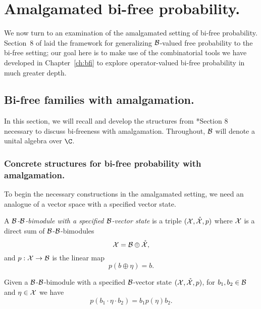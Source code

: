 \chapter{Amalgamated bi-free probability.}
\label{ch:abfp}
We now turn to an examination of the amalgamated setting of bi-free probability.
Section~8 of \cite{voiculescu2014free} laid the framework for generalizing $\mathcal{B}$-valued free probability to the bi-free setting; our goal here is to make use of the combinatorial tools we have developed in Chapter~\ref{ch:bfi} to explore operator-valued bi-free probability in much greater depth.



















\section{Bi-free families with amalgamation.}
\label{sec:bifreefamilieswithamalgamation}



In this section, we will recall and develop the structures from \cite{voiculescu2014free}*{Section 8} necessary to discuss bi-freeness with amalgamation.
Throughout, $\mathcal{B}$ will denote a unital algebra over $\C$.




\subsection{Concrete structures for bi-free probability with amalgamation.}


To begin the necessary constructions in the amalgamated setting, we need an analogue of a vector space with a specified vector state.
\begin{definition}
	A \emph{$\mathcal{B}$-$\mathcal{B}$-bimodule with a specified $\mathcal{B}$-vector state} is a triple $(\mathcal{X}, \mathring{\mathcal{X}}, p)$ where $\mathcal{X}$ is a direct sum of $\mathcal{B}$-$\mathcal{B}$-bimodules
	\[
		\mathcal{X} = \mathcal{B} \oplus \mathring{\mathcal{X}},
	\]
	and $p : \mathcal{X} \to \mathcal{B}$ is the linear map
	\[
		p(b \oplus \eta) = b.
	\]
\end{definition}
Given a $\mathcal{B}$-$\mathcal{B}$-bimodule with a specified $\mathcal{B}$-vector state $(\mathcal{X}, \mathring{\mathcal{X}}, p)$, for $b_1, b_2 \in \mathcal{B}$ and $\eta \in \mathcal{X}$ we have
\[
	p(b_1 \cdot \eta \cdot b_2) = b_1 p(\eta) b_2.
\]


